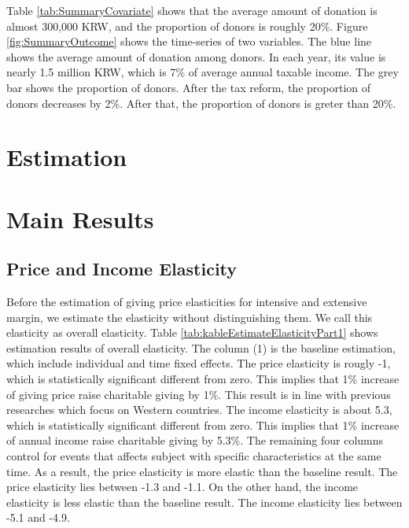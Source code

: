 \documentclass[ review  , 3p ]{elsarticle}
\begin{document}
  Table \ref{tab:SummaryCovariate} shows that
  the average amount of donation is almost 300,000 KRW,
  and the proportion of donors is roughly 20\%.
  Figure \ref{fig:SummaryOutcome} shows the time-series of two variables.
  The blue line shows the average amount of donation among donors.
  In each year, its value is nearly 1.5 million KRW,
  which is 7\% of average annual taxable income.
  The grey bar shows the proportion of donors.
  After the tax reform, the proportion of donors decreases by 2\%.
  After that, the proportion of donors is greter than 20\%.

  \hypertarget{estimation}{%
  \section{Estimation}\label{estimation}}

  \hypertarget{main-results}{%
  \section{Main Results}\label{main-results}}

  \hypertarget{price-and-income-elasticity}{%
  \subsection{Price and Income Elasticity}\label{price-and-income-elasticity}}

  Before the estimation of giving price elasticities for intensive and extensive margin, we estimate the elasticity without distinguishing them. We call this elasticity as overall elasticity.
  Table \ref{tab:kableEstimateElasticityPart1} shows estimation results of overall elasticity.
  The column (1) is the baseline estimation, which include individual and time fixed effects.
  The price elasticity is rougly -1, which is statistically significant different from zero.
  This implies that 1\% increase of giving price raise charitable giving by 1\%.
  This result is in line with previous researches which focus on Western countries.
  The income elasticity is about 5.3, which is statistically significant different from zero.
  This implies that 1\% increase of annual income raise charitable giving by 5.3\%.
  The remaining four columns control for events that affects subject with specific characteristics at the same time.
  As a result, the price elasticity is more elastic than the baseline result.
  The price elasticity lies between -1.3 and -1.1.
  On the other hand, the income elasticity is less elastic than the baseline result.
  The income elasticity lies between -5.1 and -4.9.
\end{document}
